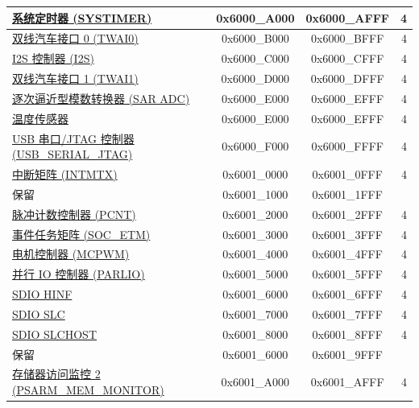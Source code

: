 \begin{ThreePartTable}
\begin{longtable}[c]{ |p{7cm}|c|c|r| }
    \hyperref[mod:systimer]{系统定时器 (SYSTIMER)}                    & 0x6000\_A000 & 0x6000\_AFFF &   4        \\\hline
    \hyperref[mod:twai]{双线汽车接口 0 (TWAI0)}                      & 0x6000\_B000 & 0x6000\_BFFF &   4        \\\hline
    \hyperref[mod:i2s]{I2S 控制器 (I2S)}            & 0x6000\_C000 & 0x6000\_CFFF &   4     \\\hline
    \hyperref[mod:twai]{双线汽车接口 1 (TWAI1)}                      & 0x6000\_D000 & 0x6000\_DFFF &   4        \\\hline
    \hyperref[mod:adc]{逐次逼近型模数转换器 (SAR ADC)}              & 0x6000\_E000 & 0x6000\_EFFF &   4        \\\hline
    \hyperref[mod:tmpsen]{温度传感器}              & 0x6000\_E000 & 0x6000\_EFFF &   4        \\\hline
    \hyperref[mod:usbserialjtag]{USB 串口/JTAG 控制器 (USB\_SERIAL\_JTAG)}                  & 0x6000\_F000 & 0x6000\_FFFF &   4     \\\hline
    \hyperref[mod:intmtrx]{中断矩阵 (INTMTX)}            & 0x6001\_0000 & 0x6001\_0FFF &   4     \\\hline
        \rowcolor{gray!25}  保留                    & 0x6001\_1000 & 0x6001\_1FFF &        \\\hline
    \hyperref[mod:pcnt]{脉冲计数控制器 (PCNT)}& 0x6001\_2000 & 0x6001\_2FFF &   4        \\\hline
    \hyperref[mod:evntaskmatrix]{事件任务矩阵 (SOC\_ETM)} & 0x6001\_3000 & 0x6001\_3FFF &   4     \\\hline
    \hyperref[mod:mcpwm]{电机控制器 (MCPWM)} & 0x6001\_4000 & 0x6001\_4FFF &   4     \\\hline
    \hyperref[mod:parlio]{并行 IO 控制器 (PARLIO) }                    & 0x6001\_5000 & 0x6001\_5FFF &   4        \\\hline
    \hyperref[mod:sdioslave]{SDIO HINF}\tnote{\textcolor{red}{2}}& 0x6001\_6000 & 0x6001\_6FFF &   4     \\\hline
    \hyperref[mod:sdioslave]{SDIO SLC}\tnote{\textcolor{red}{2}} & 0x6001\_7000 & 0x6001\_7FFF &   4  \\\hline
    \hyperref[mod:sdioslave]{SDIO SLCHOST}\tnote{\textcolor{red}{2}}                   & 0x6001\_8000 & 0x6001\_8FFF &   4 \\\hline
        \rowcolor{gray!25}  保留                    & 0x6001\_6000 & 0x6001\_9FFF &        \\\hline
    \hyperref[mod:dbgassist]{存储器访问监控 2 (PSARM\_MEM\_MONITOR)} \tnote{\textcolor{red}{2}}                & 0x6001\_A000 & 0x6001\_AFFF &   4   \\\hline    

\end{longtable}
\end{ThreePartTable}
